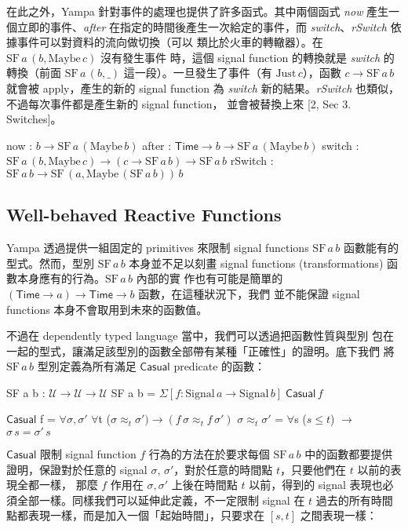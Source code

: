 \documentclass{article}
\newcommand{\Time}{\mathsf{Time}}
\newcommand{\U}{\mathcal{U}}
\newcommand{\E}[1]{\Sigma[#1]\;}
\begin{document}
  在此之外，Yampa 針對事件的處理也提供了許多函式。其中兩個函式 \textit{now}
  產生一個立即的事件、\textit{after} 在指定的時間後產生一次給定的事件，而
  \textit{switch}、\textit{rSwitch} 依據事件可以對資料的流向做切換（可以
  類比於火車的轉轍器）。在 $\text{SF}\,a\,(b,\text{Maybe}\,c)$ 沒有發生事件
  時，這個 signal function 的轉換就是 \textit{switch} 的轉換（前面 $\text{SF}\,a\,(b,\_)$ 這一段）。一旦發生了事件（有 $\text{Just}\,c$），函數 $c\to \text{SF}\,a\,b$ 就會被 apply，產生的新的 signal function 為 \textit{switch} 新的結果。\textit{rSwitch} 也類似，不過每次事件都是產生新的 signal function，
  並會被替換上來 [2, Sec 3. Switches]。

  \begin{code}
  now : $b\to \text{SF}\,a\,(\text{Maybe}\,b)$
  after : $\Time\to b\to \text{SF}\,a\,(\text{Maybe}\,b)$
  switch : $\text{SF}\,a\,(b,\text{Maybe}\,c)\to (c\to\text{SF}\,a\,b)\to\text{SF}\,a\,b$
  rSwitch : $\text{SF}\,a\,b\to\text{SF}\,(a,\text{Maybe}\,(\text{SF}\,a\,b))\,b$
  \end{code}

  \subsection{Well-behaved Reactive Functions}

  Yampa 透過提供一組固定的 primitives 來限制 signal functions $\text{SF}\,a\,b$
  函數能有的型式。然而，型別 $\text{SF}\,a\,b$ 本身並不足以刻畫 signal
  functions (transformations) 函數本身應有的行為。$\text{SF}\,a\,b$ 內部的實
  作也有可能是簡單的 $(\Time\to a)\to\Time\to b$ 函數，在這種狀況下，我們
  並不能保證 signal functions 本身不會取用到未來的函數值。

  不過在 dependently typed language 當中，我們可以透過把函數性質與型別
  包在一起的型式，讓滿足該型別的函數全部帶有某種「正確性」的證明。底下我們
  將 $\text{SF}\,a\,b$ 型別定義為所有滿足 $\textsf{Casual}$ predicate 的函數：

  \begin{code}
  SF a b : $\U\to\U\to\U$
  SF a b = $\E{f: \text{Signal}\, a \to \text{Signal}\, b} \mathsf{Casual}\, f$

  $\mathsf{Casual}$ f = $\forall{\sigma,\sigma'}$ $\forall${t} ($\sigma\approx_t\sigma')\to(f\,\sigma\approx_t f\,\sigma')$
  $\sigma\approx_t\sigma'$ = $\forall${s} ($s\le t$) $\to$ $\sigma\,s=\sigma'\,s$
  \end{code}

  $\mathsf{Casual}$ 限制 signal function $f$ 行為的方法在於要求每個
  $\text{SF}\,a\,b$ 中的函數都要提供證明，保證對於任意的 signal $\sigma$,
  $\sigma'$，對於任意的時間點 $t$，只要他們在 $t$ 以前的表現全都一樣，
  那麼 $f$ 作用在 $\sigma,\sigma'$ 上後在時間點 $t$ 以前，得到的 signal
  表現也必須全部一樣。同樣我們可以延伸此定義，不一定限制 signal 在 $t$
  過去的所有時間點都表現一樣，而是加入一個「起始時間」，只要求在 $[s,t]$
  之間表現一樣：
\end{document}
